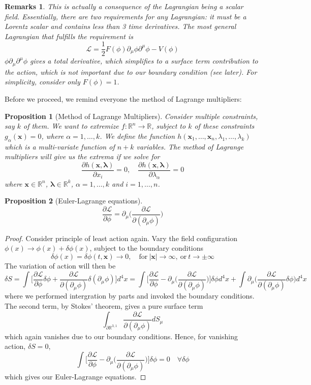 \documentclass[a4paper]{article}
\newtheorem{remarks}{Remarks}[section]
\theoremstyle{new}
\newtheorem{prop}{Proposition}[section]
\begin{document}
\begin{remarks}
This is actually a consequence of the Lagrangian being a scalar field. Essentially, there are two requirements for any Lagrangian: it must be a Lorentz scalar and contains less than 3 time derivatives. The most general Lagrangian that fulfills the requirement is
$$\mathcal{L}=\frac{1}{2}F(\phi)\partial_\mu\phi\partial^\mu\phi-V(\phi)$$
$\phi\partial_\mu\partial^\mu\phi$ gives a total derivative, which simplifies to a surface term contribution to the action, which is not important due to our boundary condition (see later). For simplicity, consider only $F(\phi)=1$.
\end{remarks}
Before we proceed, we remind everyone the method of Lagrange multipliers:
\begin{prop}[Method of Lagrange Multipliers]
Consider multiple constraints, say $k$ of them. We want to extremize $f:\mathbb{R}^n\rightarrow\mathbb{R}$, subject to $k$ of these constraints $g_\alpha(\mathbf{x})=0$, where $\alpha=1,\dots,k$. We define the function $h(\mathbf{x}_1,\dots,\mathbf{x}_n,\lambda_1,\dots,\lambda_k)$ which is a multi-variate function of $n+k$ variables. The method of Lagrange multipliers will give us the extrema if we solve for
$$\frac{\partial h(\mathbf{x},\boldsymbol{\lambda})}{\partial x_i}=0,\quad\frac{\partial h(\mathbf{x},\boldsymbol{\lambda})}{\partial\lambda_\alpha}=0$$
where $\mathbf{x}\in\mathbb{R}^n$, $\boldsymbol{\lambda}\in\mathbb{R}^k$, $\alpha=1,\dots,k$ and $i=1,\dots,n$.  
\end{prop}
\begin{prop}[Euler-Lagrange equations]
$$\frac{\partial\mathcal{L}}{\partial\phi}=\partial_\mu\bigg(\frac{\partial\mathcal{L}}{\partial(\partial_\mu\phi)}\bigg)$$
\end{prop}
\begin{proof}
Consider principle of least action again. Vary the field configuration $\phi(x)\rightarrow\phi(x)+\delta\phi(x)$, subject to the boundary conditions
$$\delta\phi(x)=\delta\phi(t,\mathbf{x})\rightarrow 0,\quad\text{for}~|\mathbf{x}|\rightarrow\infty,~\text{or}~t\rightarrow\pm\infty$$
The variation of action will then be
$$\delta S=\int\bigg[\frac{\partial\mathcal{L}}{\partial\phi}\delta\phi+\frac{\partial\mathcal{L}}{\partial(\partial_\mu\phi)}\delta(\partial_\mu\phi)\bigg]d^4x=\int\bigg[\frac{\partial\mathcal{L}}{\partial\phi}-\partial_\mu\bigg(\frac{\partial\mathcal{L}}{\partial(\partial_\mu\phi)}\bigg)\bigg]\delta\phi d^4x+\int\partial_\mu\bigg(\frac{\partial\mathcal{L}}{\partial(\partial_\mu\phi)}\delta\phi\bigg)d^4x$$
where we performed intergration by parts and invoked the boundary conditions. The second term, by Stokes' theorem, gives a pure surface term
$$\int_{\partial\mathbb{R}^{3,1}}\frac{\partial\mathcal{L}}{\partial(\partial_\mu\phi)}dS_\mu$$
which again vanishes due to our boundary conditions. Hence, for vanishing action, $\delta S=0$,
$$\int\bigg[\frac{\partial\mathcal{L}}{\partial\phi}-\partial_\mu\bigg(\frac{\partial\mathcal{L}}{\partial(\partial_\mu\phi)}\bigg)\bigg]\delta\phi=0\quad\forall\delta\phi$$
which gives our Euler-Lagrange equations.
\end{proof}
\end{document}

